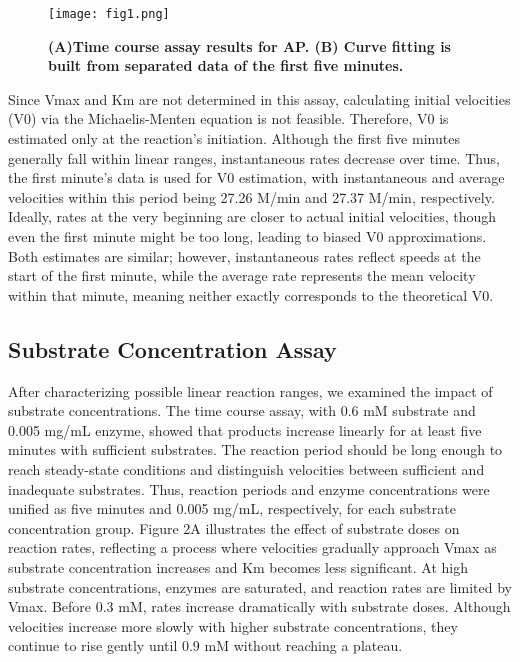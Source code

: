 \documentclass[a4paper,10pt]{article}
\begin{document}
\begin{multicols}{2}
\begin{figure}[H]
\centering
\texttt{[image: fig1.png]}
\caption{\scriptsize \textbf{(A)Time course assay results for AP. (B) Curve fitting is built from separated data of the first five minutes.}}
\label{fig2}
\end{figure}


Since Vmax and Km are not determined in this assay, calculating initial velocities (V0) via the Michaelis-Menten equation is not feasible. Therefore, V0 is estimated only at the reaction's initiation. Although the first five minutes generally fall within linear ranges, instantaneous rates decrease over time. Thus, the first minute's data is used for V0 estimation, with instantaneous and average velocities within this period being 27.26 \textmu M/min and 27.37 \textmu M/min, respectively. Ideally, rates at the very beginning are closer to actual initial velocities, though even the first minute might be too long, leading to biased V0 approximations. Both estimates are similar; however, instantaneous rates reflect speeds at the start of the first minute, while the average rate represents the mean velocity within that minute, meaning neither exactly corresponds to the theoretical V0.





\subsection{Substrate Concentration Assay}


After characterizing possible linear reaction ranges, we examined the impact of substrate concentrations. The time course assay, with 0.6 mM substrate and 0.005 mg/mL enzyme, showed that products increase linearly for at least five minutes with sufficient substrates. The reaction period should be long enough to reach steady-state conditions and distinguish velocities between sufficient and inadequate substrates. Thus, reaction periods and enzyme concentrations were unified as five minutes and 0.005 mg/mL, respectively, for each substrate concentration group. Figure 2A illustrates the effect of substrate doses on reaction rates, reflecting a process where velocities gradually approach Vmax as substrate concentration increases and Km becomes less significant. At high substrate concentrations, enzymes are saturated, and reaction rates are limited by Vmax. Before 0.3 mM, rates increase dramatically with substrate doses. Although velocities increase more slowly with higher substrate concentrations, they continue to rise gently until 0.9 mM without reaching a plateau.



\end{multicols}
\end{document}
